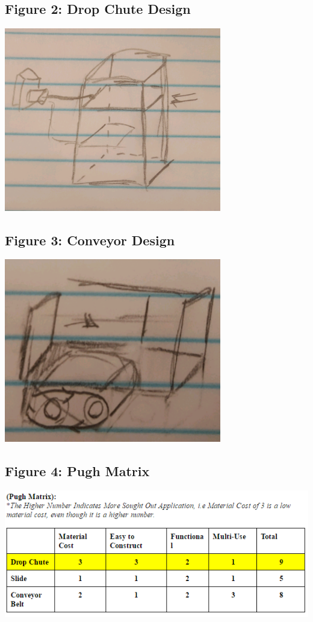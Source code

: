 \documentclass{article}
\begin{document}
\subsection{Figure 2: Drop Chute Design}
\begin{center}{\includegraphics[height=8cm]{DropChute.png}}\end{center}

\subsection{Figure 3: Conveyor Design}
\begin{center}{\includegraphics[height=8cm]{Conveyor.png}}\end{center}

\subsection{Figure 4: Pugh Matrix}
\includegraphics[width=\textwidth]{PughMatrix.png}
\end{document}
